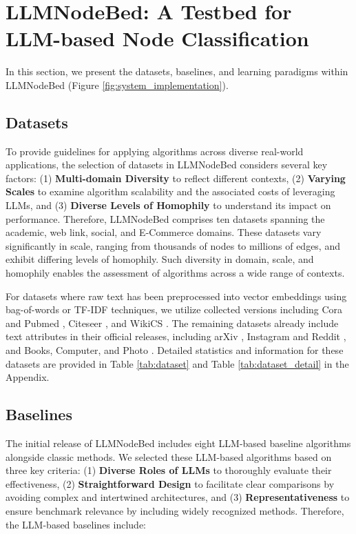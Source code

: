 \section{LLMNodeBed: A Testbed for LLM-based Node Classification}
In this section, we present the datasets, baselines, and learning paradigms within LLMNodeBed (Figure \ref{fig:system_implementation}).

\subsection{Datasets}

To provide guidelines for applying algorithms across diverse real-world applications, the selection of datasets in LLMNodeBed considers several key factors: (1) \textbf{Multi-domain Diversity} to reflect different contexts, (2) \textbf{Varying Scales} to examine algorithm scalability and the associated costs of leveraging LLMs, and (3) \textbf{Diverse Levels of Homophily} to understand its impact on performance. Therefore, LLMNodeBed comprises ten datasets spanning the academic, web link, social, and E-Commerce domains. These datasets vary significantly in scale, ranging from thousands of nodes to millions of edges, and exhibit differing levels of homophily. Such diversity in domain, scale, and homophily enables the assessment of algorithms across a wide range of contexts. 

For datasets where raw text has been preprocessed into vector embeddings using bag-of-words or TF-IDF techniques, we utilize collected versions including Cora and Pubmed \cite{he2023TAPE}, Citeseer \cite{chen2024exploring}, and WikiCS \cite{liu2023one}. The remaining datasets already include text attributes in their official releases, including arXiv \cite{hu2020open}, Instagram and Reddit \cite{Huang2024GraphAdapter}, and Books, Computer, and Photo \cite{yan2023comprehensive}. Detailed statistics and information for these datasets are provided in Table \ref{tab:dataset} and Table \ref{tab:dataset_detail} in the Appendix.




\subsection{Baselines} 
The initial release of LLMNodeBed includes eight LLM-based baseline algorithms alongside classic methods. We selected these LLM-based algorithms based on three key criteria: (1) \textbf{Diverse Roles of LLMs} to thoroughly evaluate their effectiveness, (2) \textbf{Straightforward Design} to facilitate clear comparisons by avoiding complex and intertwined architectures, and (3) \textbf{Representativeness} to ensure benchmark relevance by including widely recognized methods. Therefore, the LLM-based baselines include:

